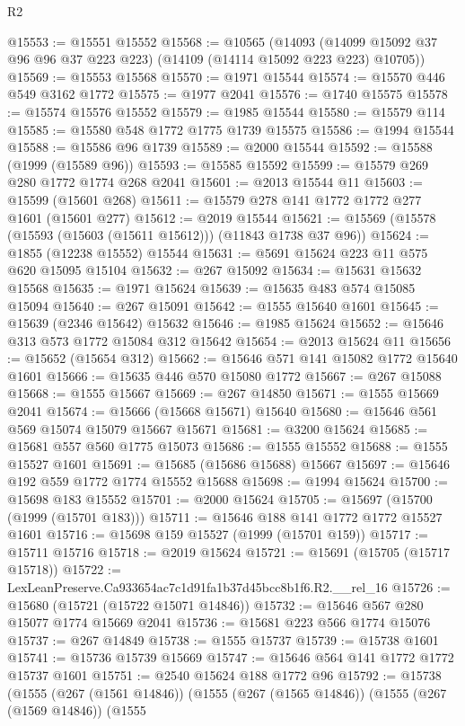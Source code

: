 \begin{lexlean}{R2}
\begin{coremodule}
@15553 := @15551 @15552
@15568 := @10565
    (@14093 (@14099 @15092 @37 @96 @96 @37 @223 @223) (@14109 (@14114 @15092 @223 @223) @10705))
@15569 := @15553 @15568
@15570 := @1971 @15544
@15574 := @15570 @446 @549 @3162 @1772
@15575 := @1977 @2041
@15576 := @1740 @15575
@15578 := @15574 @15576 @15552
@15579 := @1985 @15544
@15580 := @15579 @114
@15585 := @15580 @548 @1772 @1775 @1739 @15575
@15586 := @1994 @15544
@15588 := @15586 @96 @1739
@15589 := @2000 @15544
@15592 := @15588 (@1999 (@15589 @96))
@15593 := @15585 @15592
@15599 := @15579 @269 @280 @1772 @1774 @268 @2041
@15601 := @2013 @15544 @11
@15603 := @15599 (@15601 @268)
@15611 := @15579 @278 @141 @1772 @1772 @277 @1601 (@15601 @277)
@15612 := @2019 @15544
@15621 := @15569 (@15578 (@15593 (@15603 (@15611 @15612))) (@11843 @1738 @37 @96))
@15624 := @1855 (@12238 @15552) @15544
@15631 := @5691 @15624 @223 @11 @575 @620 @15095 @15104
@15632 := @267 @15092
@15634 := @15631 @15632 @15568
@15635 := @1971 @15624
@15639 := @15635 @483 @574 @15085 @15094
@15640 := @267 @15091
@15642 := @1555 @15640 @1601
@15645 := @15639 (@2346 @15642) @15632
@15646 := @1985 @15624
@15652 := @15646 @313 @573 @1772 @15084 @312 @15642
@15654 := @2013 @15624 @11
@15656 := @15652 (@15654 @312)
@15662 := @15646 @571 @141 @15082 @1772 @15640 @1601
@15666 := @15635 @446 @570 @15080 @1772
@15667 := @267 @15088
@15668 := @1555 @15667
@15669 := @267 @14850
@15671 := @1555 @15669 @2041
@15674 := @15666 (@15668 @15671) @15640
@15680 := @15646 @561 @569 @15074 @15079 @15667 @15671
@15681 := @3200 @15624
@15685 := @15681 @557 @560 @1775 @15073
@15686 := @1555 @15552
@15688 := @1555 @15527 @1601
@15691 := @15685 (@15686 @15688) @15667
@15697 := @15646 @192 @559 @1772 @1774 @15552 @15688
@15698 := @1994 @15624
@15700 := @15698 @183 @15552
@15701 := @2000 @15624
@15705 := @15697 (@15700 (@1999 (@15701 @183)))
@15711 := @15646 @188 @141 @1772 @1772 @15527 @1601
@15716 := @15698 @159 @15527 (@1999 (@15701 @159))
@15717 := @15711 @15716
@15718 := @2019 @15624
@15721 := @15691 (@15705 (@15717 @15718))
@15722 := LexLeanPreserve.Ca933654ac7c1d91fa1b37d45bcc8b1f6.R2.__rel_16
@15726 := @15680 (@15721 (@15722 @15071 @14846))
@15732 := @15646 @567 @280 @15077 @1774 @15669 @2041
@15736 := @15681 @223 @566 @1774 @15076
@15737 := @267 @14849
@15738 := @1555 @15737
@15739 := @15738 @1601
@15741 := @15736 @15739 @15669
@15747 := @15646 @564 @141 @1772 @1772 @15737 @1601
@15751 := @2540 @15624 @188 @1772 @96
@15792 := @15738
    (@1555
      (@267 (@1561 @14846))
      (@1555
        (@267 (@1565 @14846))
        (@1555
          (@267 (@1569 @14846))
          (@1555

\end{coremodule}
\end{lexlean}
